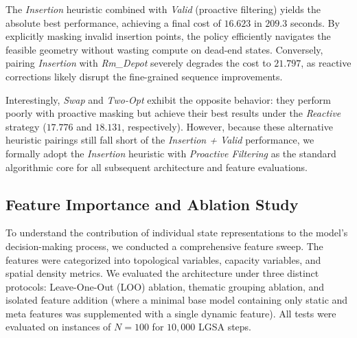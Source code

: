 \documentclass[letterpaper]{article} %
\begin{document}
The \textit{Insertion} heuristic combined with \textit{Valid} (proactive filtering) yields the absolute best performance, achieving a final cost of $16.623$ in $209.3$ seconds. By explicitly masking invalid insertion points, the policy efficiently navigates the feasible geometry without wasting compute on dead-end states. Conversely, pairing \textit{Insertion} with \textit{Rm\_Depot} severely degrades the cost to $21.797$, as reactive corrections likely disrupt the fine-grained sequence improvements. 

Interestingly, \textit{Swap} and \textit{Two-Opt} exhibit the opposite behavior: they perform poorly with proactive masking but achieve their best results under the \textit{Reactive} strategy ($17.776$ and $18.131$, respectively). However, because these alternative heuristic pairings still fall short of the \textit{Insertion + Valid} performance, we formally adopt the \textit{Insertion} heuristic with \textit{Proactive Filtering} as the standard algorithmic core for all subsequent architecture and feature evaluations.

\subsection{Feature Importance and Ablation Study}
\label{sec:feature_ablation}

To understand the contribution of individual state representations to the model's decision-making process, we conducted a comprehensive feature sweep. The features were categorized into topological variables, capacity variables, and spatial density metrics. We evaluated the architecture under three distinct protocols: Leave-One-Out (LOO) ablation, thematic grouping ablation, and isolated feature addition (where a minimal base model containing only static and meta features was supplemented with a single dynamic feature). All tests were evaluated on instances of $N=100$ for $10{,}000$ LGSA steps.
\end{document}
